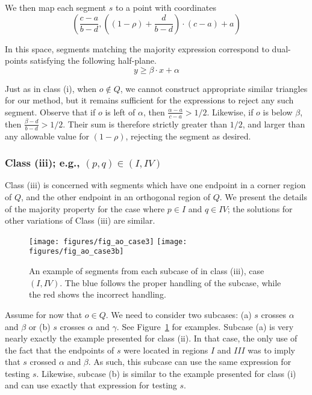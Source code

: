 \noindent We then map each segment $s$ to a point with coordinates
\[
\left (\frac{c-a}{b-d}, \left ( (1 - \rho) + \frac{d}{b-d} \right ) \cdot (c-a) + a \right )
\]

\noindent In this space, segments matching the majority expression correspond to dual-points satisfying the following half-plane.
\[
y \geq \beta \cdot x + \alpha
\]

Just as in class (i), when $o \not \in Q$, we cannot construct appropriate similar triangles for our method, but it remains sufficient for the expressions to reject any such segment. Observe that if $o$ is left of $\alpha$, then $\frac{\alpha - a}{c - a} > 1/2$. Likewise, if $o$ is below $\beta$, then $\frac{\beta - d}{b - d} > 1/2$. Their sum is therefore strictly greater than $1/2$, and larger than any allowable value for $(1 - \rho)$, rejecting the segment as desired.


\subsubsection{Class (iii); e.g., $(p, q) \in (I, IV)$}
\label{:rectanges:ao:class3}

Class (iii) is concerned with segments which have one endpoint in a corner region of $Q$, and the other endpoint in an orthogonal region of $Q$. We present the details of the majority property for the case where $p \in I$ and $q \in IV$; the solutions for other variations of Class (iii) are similar.

\begin{figure}[t]
\begin{center}
  \texttt{[image: figures/fig\_ao\_case3]}
  \hspace{1.0em}
  \texttt{[image: figures/fig\_ao\_case3b]}
  \caption[An example of a segment in class (iii), case $(I, IV)$.]{An example of segments from each subcase of in class (iii), case $(I, IV)$. The blue follows the proper handling of the subcase, while the red shows the incorrect handling.}
  \label{fig:rectangles:ao:case3}
\end{center}
\end{figure}

Assume for now that $o \in Q$. We need to consider two subcases: (a) $s$ crosses $\alpha$ and $\beta$ or (b) $s$ crosses $\alpha$ and $\gamma$. See Figure~\ref{fig:rectangles:ao:case3} for examples. Subcase (a) is very nearly exactly the example presented for class (ii). In that case, the only use of the fact that the endpoints of $s$ were located in regions $I$ and $III$ was to imply that $s$ crossed $\alpha$ and $\beta$. As such, this subcase can use the same expression for testing $s$. Likewise, subcase (b) is similar to the example presented for class (i) and can use exactly that expression for testing $s$.

